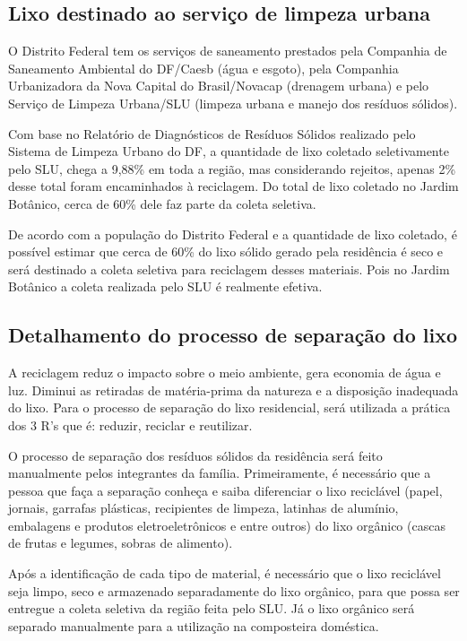 \subsection{Lixo destinado ao serviço de limpeza urbana}

O Distrito Federal tem os serviços de saneamento prestados pela Companhia de
Saneamento Ambiental do DF/Caesb (água e esgoto), pela Companhia Urbanizadora da Nova Capital do Brasil/Novacap (drenagem urbana) e pelo Serviço de Limpeza Urbana/SLU (limpeza urbana e manejo dos resíduos sólidos).

Com base no Relatório de Diagnósticos de Resíduos Sólidos realizado pelo Sistema de Limpeza Urbano do DF, a quantidade de lixo coletado seletivamente pelo SLU, chega a 9,88\% em toda a região, mas considerando rejeitos, apenas 2\% desse total foram encaminhados à reciclagem. Do total de lixo coletado no Jardim Botânico, cerca de 60\% dele faz parte da coleta seletiva.

De acordo com a população do Distrito Federal e a quantidade de lixo coletado, é possível estimar que cerca de 60\% do lixo sólido gerado pela residência é seco e será destinado a coleta seletiva para reciclagem desses materiais. Pois no Jardim Botânico a coleta realizada pelo SLU é realmente efetiva.

\subsection{Detalhamento do processo de separação do lixo}

A reciclagem reduz o impacto sobre o meio ambiente, gera economia de água e luz.
Diminui as retiradas de matéria-prima da natureza e a disposição inadequada do lixo. Para o
processo de separação do lixo residencial, será utilizada a prática dos 3 R's que é: reduzir, reciclar
e reutilizar.

O processo de separação dos resíduos sólidos da residência será feito manualmente
pelos integrantes da família. Primeiramente, é necessário que a pessoa que faça a separação
conheça e saiba diferenciar o lixo reciclável (papel, jornais, garrafas plásticas, recipientes de
limpeza, latinhas de alumínio, embalagens e produtos eletroeletrônicos e entre outros) do lixo
orgânico (cascas de frutas e legumes, sobras de alimento).

Após a identificação de cada tipo de material, é necessário que o lixo reciclável seja
limpo, seco e armazenado separadamente do lixo orgânico, para que possa ser entregue a
coleta seletiva da região feita pelo SLU. Já o lixo orgânico será separado manualmente para a
utilização na composteira doméstica.

